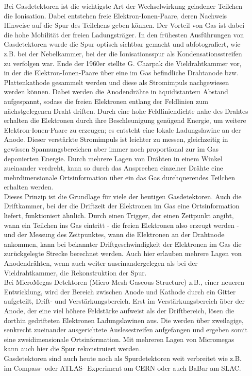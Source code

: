 \documentclass{PoS}
\begin{document}
Bei Gasdetektoren ist die wichtigste Art der Wechselwirkung geladener Teilchen die Ionisation. Dabei
entstehen freie Elektron-Ionen-Paare, deren Nachweis Hinweise auf die Spur des Teilchens geben
können. Der Vorteil von Gas ist dabei die hohe Mobilität der freien Ladungsträger.
In den frühesten Ausführungen von Gasdetektoren wurde die Spur optisch sichtbar gemacht und
abfotografiert, wie z.B. bei der Nebelkammer, bei der die Ionisationsspur als Kondensationsstreifen
zu verfolgen war. Ende der 1960er stellte G. Charpak die Vieldrahtkammer vor, in der die
Elektron-Ionen-Paare über eine im Gas befindliche Drahtanode bzw. Plattenkathode
gesammelt werden und diese als Stromimpuls nachgewiesen werden können. Dabei werden die Anodendrähte
in äquidistantem Abstand aufgespannt, sodass die freien Elektronen entlang der Feldlinien zum
nächstgelegenen Draht driften. Durch eine hohe Feldliniendichte nahe des Drahtes erhalten die
Elektronen durch ihre Beschleunigung genügend Energie, um weitere Elektron-Ionen-Paare zu erzeugen;
es entsteht eine lokale Ladungslawine an der Anode. Dieser verstärkte Stromimpuls ist leichter zu
messen, gleichzeitig in gewissen Spannungsbereichen aber immer noch proportional zur im Gas
deponierten Energie.
Durch mehrere Lagen von Drähten in einem Winkel zueinander verdreht, kann so durch das Ansprechen
einzelner Drähte eine mehrdimensionale Ortsinformation über ein das Gas durchquerendes Teilchen
erhalten werden.
\\
Dieses Prinzip ist die Grundlage für viele der heutigen Gasdetektoren. Auch die Driftkammer, bei der
die Driftzeit der Elektronen im Gas eine Ortsinformation liefert, funktioniert ähnlich. Durch einen
Trigger, der einen Zeitpunkt angibt, wann ein Teilchen ins Gas eintritt - die freien Elektronen also
erzeugt werden - und der Messung des Zeitpunktes, wann die Elektronen an der Drahtnode ankommen,
kann bei bekannter Driftgeschwindigkeit der Elektronen im Gas die zurückgelegte Strecke berechnet werden.
Auch hier erlauben mehrere Lagen von Anodendrähten, wenn auch weiter auseinandergelegen als bei der
Vieldrahtkammer, die Rekonstruktion der Spur.
\\
Bei MicroMegas Detektoren (Micro-Mesh Gaseous Structure) z.B., einer neueren Entwicklung, wird der
Bereich zwischen Anode und Kathode durch ein Gitter aufgeteilt, Drift- und Verstärkungsbereich. Erst
im Verstärkungsbereich über der Anode, der eine viel höhere Feldstärke aufweist als der
Driftbereich, lösen die dorthin gedrifteten Elektronen Ladungslawinen aus. Die werden über
zweilagige, senkrecht zueinander ausgerichtete Auslesestreifen aufgefangen und ergeben somit eine
zweidimensionale Ortsinformation. Mit mehreren Lagen von Micromegas kann auch hier die Spur
rekonstruiert werden.
\\
Gasdetektoren sind auch heute noch als Spurdetektoren weit verbreitet wie z.B. im Compass- oder
ATLAS- Experiment am CERN oder auch BaBar am SLAC.
\end{document}
